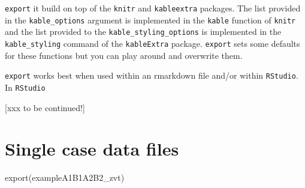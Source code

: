 \documentclass[
]{book}
\makeatletter
\newenvironment{Shaded}{\begin{snugshade}}{\end{snugshade}}
\newcommand{\FunctionTok}[1]{\textcolor[rgb]{0.00,0.00,0.00}{#1}}
\newcommand{\NormalTok}[1]{#1}
\newenvironment{kframe}{%
\medskip{}
\setlength{\fboxsep}{.8em}
 \def\at@end@of@kframe{}%
 \ifinner\ifhmode%
  \def\at@end@of@kframe{\end{minipage}}%
  \begin{minipage}{\columnwidth}%
 \fi\fi%
 \def\FrameCommand##1{\hskip\@totalleftmargin \hskip-\fboxsep
 \colorbox{shadecolor}{##1}\hskip-\fboxsep
     \hskip-\linewidth \hskip-\@totalleftmargin \hskip\columnwidth}%
 \MakeFramed {\advance\hsize-\width
   \@totalleftmargin\z@ \linewidth\hsize
   \@setminipage}}%
 {\par\unskip\endMakeFramed%
 \at@end@of@kframe}
\newenvironment{rmdblock}[1]
  {
  \begin{itemize}
  \renewcommand{\labelitemi}{
    \raisebox{-.7\height}[0pt][0pt]{
      {\setkeys{Gin}{width=3em,keepaspectratio}\texttt{[image: images/\#1]}}
    }
  }
  \setlength{\fboxsep}{1em}
  \begin{kframe}
  \item
  }
  {
  \end{kframe}
  \end{itemize}
  }
\newenvironment{rmdnote}
  {\begin{rmdblock}{bulp}}
{\end{rmdblock}}
\makeatother
\begin{document}
\begin{rmdnote}
\texttt{export} it build on top of the \texttt{knitr} and
\texttt{kableextra} packages. The list provided in the
\texttt{kable\_options} argument is implemented in the \texttt{kable}
function of \texttt{knitr} and the list provided to the
\texttt{kable\_styling\_options} is implemented in the
\texttt{kable\_styling} command of the \texttt{kableExtra} package.
\texttt{export} sets some defaults for these functions but you can play
around and overwrite them.
\end{rmdnote}

\texttt{export} works best when used within an rmarkdown file and/or within \texttt{RStudio}.\\
In \texttt{RStudio}

{[}xxx to be continued!{]}

\hypertarget{single-case-data-files}{%
\section{Single case data files}\label{single-case-data-files}}

\begin{Shaded}
\begin{Highlighting}[]
\FunctionTok{export}\NormalTok{(exampleA1B1A2B2\_zvt)}
\end{Highlighting}
\end{Shaded}
\end{document}
